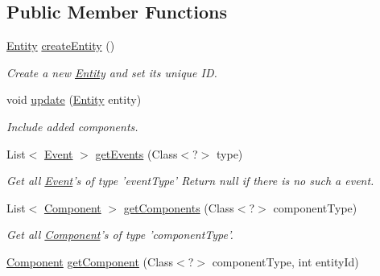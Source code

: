 \subsection*{Public Member Functions}
\begin{DoxyCompactItemize}
\item 
\hyperlink{classbr_1_1unb_1_1unbomber_1_1core_1_1_entity}{Entity} \hyperlink{classbr_1_1unb_1_1unbomber_1_1core_1_1_entity_manager_impl_a8fc2ea56cd82e7de76b7217c378ee511}{create\+Entity} ()
\begin{DoxyCompactList}\small\item\em Create a new \hyperlink{classbr_1_1unb_1_1unbomber_1_1core_1_1_entity}{Entity} and set its unique I\+D. \end{DoxyCompactList}\item 
void \hyperlink{classbr_1_1unb_1_1unbomber_1_1core_1_1_entity_manager_impl_ace0c01af2f4852963c5f7b1c76b0bd88}{update} (\hyperlink{classbr_1_1unb_1_1unbomber_1_1core_1_1_entity}{Entity} entity)
\begin{DoxyCompactList}\small\item\em Include added components. \end{DoxyCompactList}\item 
List$<$ \hyperlink{classbr_1_1unb_1_1unbomber_1_1core_1_1_event}{Event} $>$ \hyperlink{classbr_1_1unb_1_1unbomber_1_1core_1_1_entity_manager_impl_ae2c0dc2baf69be23b27085073da6a67d}{get\+Events} (Class$<$?$>$ type)
\begin{DoxyCompactList}\small\item\em Get all \hyperlink{classbr_1_1unb_1_1unbomber_1_1core_1_1_event}{Event}'s of type 'event\+Type' Return null if there is no such a event. \end{DoxyCompactList}\item 
List$<$ \hyperlink{classbr_1_1unb_1_1unbomber_1_1core_1_1_component}{Component} $>$ \hyperlink{classbr_1_1unb_1_1unbomber_1_1core_1_1_entity_manager_impl_a1c1f0f466e198e0889c6515b853f7479}{get\+Components} (Class$<$?$>$ component\+Type)
\begin{DoxyCompactList}\small\item\em Get all \hyperlink{classbr_1_1unb_1_1unbomber_1_1core_1_1_component}{Component}'s of type 'component\+Type'. \end{DoxyCompactList}\item 
\hyperlink{classbr_1_1unb_1_1unbomber_1_1core_1_1_component}{Component} \hyperlink{classbr_1_1unb_1_1unbomber_1_1core_1_1_entity_manager_impl_aee5ec963123badad3cb808480561576b}{get\+Component} (Class$<$?$>$ component\+Type, int entity\+Id)

\end{DoxyCompactItemize}
